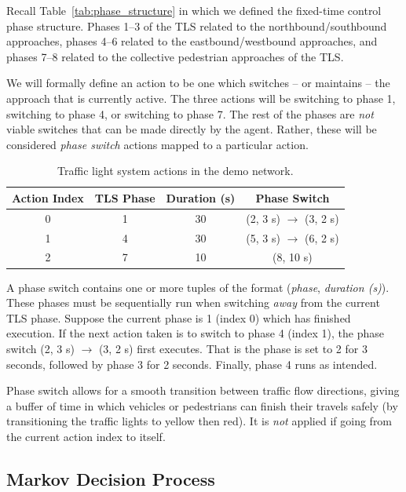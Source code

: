 \documentclass[a4paper]{report}
\begin{document}
Recall Table~\ref{tab:phase_structure} in which we defined the fixed-time control phase structure. Phases 1--3 of the TLS related to the northbound/southbound approaches, phases 4--6 related to the eastbound/westbound approaches, and phases 7--8 related to the collective pedestrian approaches of the TLS.

We will formally define an action to be one which switches -- or maintains -- the approach that is currently active. The three actions will be switching to phase 1, switching to phase 4, or switching to phase 7. The rest of the phases are \emph{not} viable switches that can be made directly by the agent. Rather, these will be considered \emph{phase switch} actions mapped to a particular action.

\begin{table}[H]
  \centering
  \begin{tabular}{c c c c}
    \hline
    \textbf{Action Index} & \textbf{TLS Phase} & \textbf{Duration (s)} & \textbf{Phase Switch} \\
    \hline
    0 & 1 & 30 & (2, 3 s) $\to$ (3, 2 s) \\
    \hline
    1 & 4 & 30 & (5, 3 s) $\to$ (6, 2 s) \\
    \hline
    2 & 7 & 10 & (8, 10 s) \\
    \hline
  \end{tabular}
  \caption{Traffic light system actions in the demo network.}
  \label{tab:phase_actions}
\end{table}

A phase switch contains one or more tuples of the format (\emph{phase}, \emph{duration (s)}). These phases must be sequentially run when switching \emph{away} from the current TLS phase. Suppose the current phase is 1 (index 0) which has finished execution. If the next action taken is to switch to phase 4 (index 1), the phase switch (2, 3 s) $\to$ (3, 2 s) first executes. That is the phase is set to 2 for 3 seconds, followed by phase 3 for 2 seconds. Finally, phase 4 runs as intended.

Phase switch allows for a smooth transition between traffic flow directions, giving a buffer of time in which vehicles or pedestrians can finish their travels safely (by transitioning the traffic lights to yellow then red). It is \emph{not} applied if going from the current action index to itself.

\subsection{Markov Decision Process}
\end{document}
